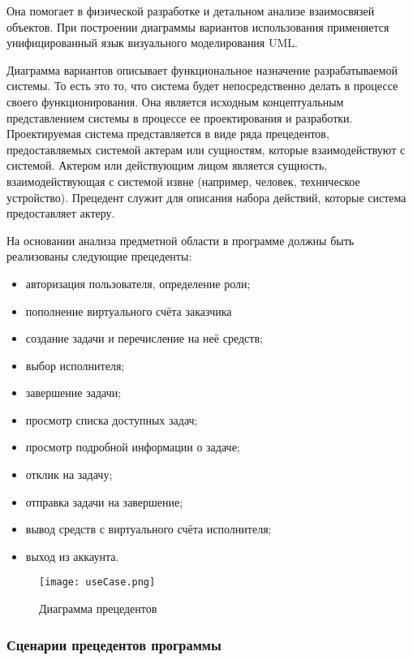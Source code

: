 Она помогает в физической разработке и детальном анализе взаимосвязей объектов. При построении диаграммы вариантов использования применяется унифицированный язык визуального моделирования UML.

Диаграмма вариантов описывает функциональное назначение разрабатываемой системы. То есть это то, что система будет непосредственно делать в процессе своего функционирования. Она является исходным концептуальным представлением системы в процессе ее проектирования и разработки. Проектируемая система представляется в виде ряда прецедентов, предоставляемых системой актерам или сущностям, которые взаимодействуют с системой. Актером или действующим лицом является сущность, взаимодействующая с системой извне (например, человек, техническое устройство). Прецедент служит для описания набора действий, которые система предоставляет актеру.

На основании анализа предметной области в программе должны быть реализованы следующие прецеденты:
\begin{itemize}
\item авторизация пользователя, определение роли;
\item пополнение виртуального счёта заказчика
\item создание задачи и перечисление на неё средств;
\item выбор исполнителя;
\item завершение задачи;
\item просмотр списка доступных задач;
\item просмотр подробной информации о задаче;
\item отклик на задачу;
\item отправка задачи на завершение;
\item вывод средств с виртуального счёта исполнителя;
\item выход из аккаунта.
\end{itemize}
\clearpage

\begin{figure}[ht]
	\texttt{[image: useCase.png]}
	\caption{Диаграмма прецедентов}
	\label{ucUML:image}
\end{figure}

\subsubsection{Сценарии прецедентов программы}

